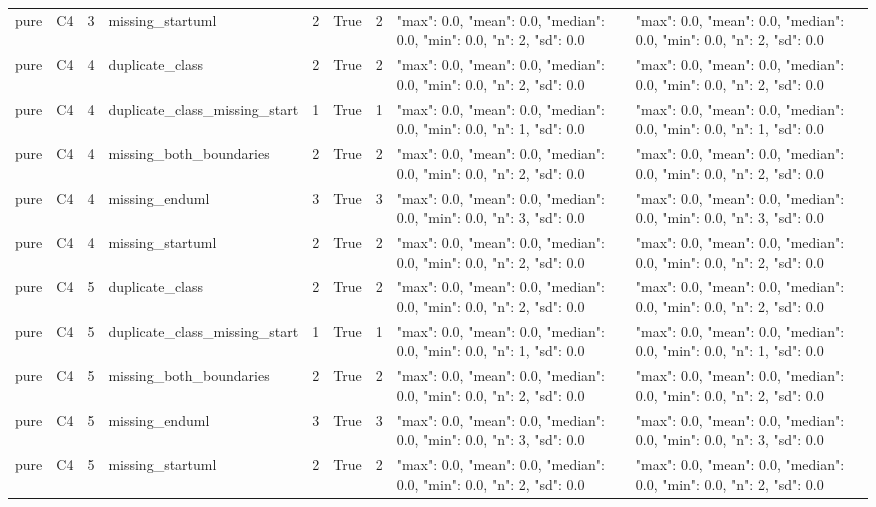 \begin{tabular}{lllllllll}
pure & C4 & 3 & missing\_startuml & 2 & True & 2 & {"max": 0.0, "mean": 0.0, "median": 0.0, "min": 0.0, "n": 2, "sd": 0.0} & {"max": 0.0, "mean": 0.0, "median": 0.0, "min": 0.0, "n": 2, "sd": 0.0} \\
pure & C4 & 4 & duplicate\_class & 2 & True & 2 & {"max": 0.0, "mean": 0.0, "median": 0.0, "min": 0.0, "n": 2, "sd": 0.0} & {"max": 0.0, "mean": 0.0, "median": 0.0, "min": 0.0, "n": 2, "sd": 0.0} \\
pure & C4 & 4 & duplicate\_class\_missing\_start & 1 & True & 1 & {"max": 0.0, "mean": 0.0, "median": 0.0, "min": 0.0, "n": 1, "sd": 0.0} & {"max": 0.0, "mean": 0.0, "median": 0.0, "min": 0.0, "n": 1, "sd": 0.0} \\
pure & C4 & 4 & missing\_both\_boundaries & 2 & True & 2 & {"max": 0.0, "mean": 0.0, "median": 0.0, "min": 0.0, "n": 2, "sd": 0.0} & {"max": 0.0, "mean": 0.0, "median": 0.0, "min": 0.0, "n": 2, "sd": 0.0} \\
pure & C4 & 4 & missing\_enduml & 3 & True & 3 & {"max": 0.0, "mean": 0.0, "median": 0.0, "min": 0.0, "n": 3, "sd": 0.0} & {"max": 0.0, "mean": 0.0, "median": 0.0, "min": 0.0, "n": 3, "sd": 0.0} \\
pure & C4 & 4 & missing\_startuml & 2 & True & 2 & {"max": 0.0, "mean": 0.0, "median": 0.0, "min": 0.0, "n": 2, "sd": 0.0} & {"max": 0.0, "mean": 0.0, "median": 0.0, "min": 0.0, "n": 2, "sd": 0.0} \\
pure & C4 & 5 & duplicate\_class & 2 & True & 2 & {"max": 0.0, "mean": 0.0, "median": 0.0, "min": 0.0, "n": 2, "sd": 0.0} & {"max": 0.0, "mean": 0.0, "median": 0.0, "min": 0.0, "n": 2, "sd": 0.0} \\
pure & C4 & 5 & duplicate\_class\_missing\_start & 1 & True & 1 & {"max": 0.0, "mean": 0.0, "median": 0.0, "min": 0.0, "n": 1, "sd": 0.0} & {"max": 0.0, "mean": 0.0, "median": 0.0, "min": 0.0, "n": 1, "sd": 0.0} \\
pure & C4 & 5 & missing\_both\_boundaries & 2 & True & 2 & {"max": 0.0, "mean": 0.0, "median": 0.0, "min": 0.0, "n": 2, "sd": 0.0} & {"max": 0.0, "mean": 0.0, "median": 0.0, "min": 0.0, "n": 2, "sd": 0.0} \\
pure & C4 & 5 & missing\_enduml & 3 & True & 3 & {"max": 0.0, "mean": 0.0, "median": 0.0, "min": 0.0, "n": 3, "sd": 0.0} & {"max": 0.0, "mean": 0.0, "median": 0.0, "min": 0.0, "n": 3, "sd": 0.0} \\
pure & C4 & 5 & missing\_startuml & 2 & True & 2 & {"max": 0.0, "mean": 0.0, "median": 0.0, "min": 0.0, "n": 2, "sd": 0.0} & {"max": 0.0, "mean": 0.0, "median": 0.0, "min": 0.0, "n": 2, "sd": 0.0} \\

\end{tabular}
